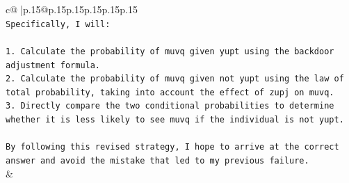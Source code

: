 \documentclass{article}
\begin{document}
{\begin{supertabular}{c@{$\;$}|p{.15\linewidth}@{}p{.15\linewidth}p{.15\linewidth}p{.15\linewidth}p{.15\linewidth}p{.15\linewidth}}
{{{\\ 
\texttt{Specifically, I will:} \\
\\ 
\texttt{1. Calculate the probability of muvq given yupt using the backdoor adjustment formula.} \\
\texttt{2. Calculate the probability of muvq given not yupt using the law of total probability, taking into account the effect of zupj on muvq.} \\
\texttt{3. Directly compare the two conditional probabilities to determine whether it is less likely to see muvq if the individual is not yupt.} \\
\\ 
\texttt{By following this revised strategy, I hope to arrive at the correct answer and avoid the mistake that led to my previous failure.} \\
            }
        }
    }
    & \\ \\

\end{supertabular}
}
\end{document}
